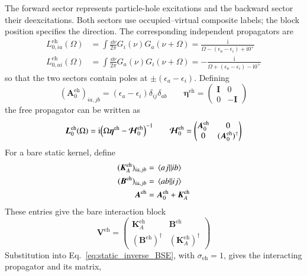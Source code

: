\documentclass[aip,jcp,reprint,noshowkeys,superscriptaddress]{revtex4-1}
\newcommand{\eh}{\text{eh}}
\newcommand{\ii}{\mathrm{i}}
\newcommand{\bA}{\boldsymbol{A}}
\newcommand{\bB}{\boldsymbol{B}}
\newcommand{\bI}{\boldsymbol{I}}
\newcommand{\bK}{\boldsymbol{K}}
\newcommand{\bL}{\boldsymbol{L}}
\newcommand{\bV}{\boldsymbol{V}}
\newcommand{\bEta}{\boldsymbol{\eta}}
\newcommand{\bcalH}{\boldsymbol{\mathcal{H}}}
\begin{document}
The forward sector represents particle-hole excitations and the backward
sector their deexcitations. Both sectors use occupied--virtual composite
labels; the block position specifies the direction. The corresponding
independent propagators are
\begin{align}
    L_{0,ia}^{\eh}(\Omega)
    &=
    \int\frac{\dd{\nu}}{2\pi}
    G_i(\nu)G_a(\nu+\Omega)
    =
    \frac{\ii}{\Omega-(\epsilon_a-\epsilon_i)+\ii 0^+}
    \\
    L_{0,ai}^{\eh}(\Omega)
    &=
    \int\frac{\dd{\nu}}{2\pi}
    G_a(\nu)G_i(\nu+\Omega)
    =
    -\frac{\ii}{\Omega+(\epsilon_a-\epsilon_i)-\ii 0^+}
    \label{eq:L0_eh_integrated}
\end{align}
so that the two sectors contain poles at $\pm(\epsilon_a-\epsilon_i)$.
Defining
\begin{equation*}
    (\bA_0^{\eh})_{ia,jb}
    =
    (\epsilon_a-\epsilon_i)\delta_{ij}\delta_{ab}
    \qquad
    \bEta^{\eh}
    =
    \begin{pmatrix}\bI&0\\0&-\bI\end{pmatrix}
\end{equation*}
the free propagator can be written as
\begin{equation}
    \bL_0^{\eh}(\Omega)
    =
    \ii
    \qty(
        \Omega\bEta^{\eh}-\bcalH_0^{\eh}
    )^{-1}
    \qquad
    \bcalH_0^{\eh}
    =
    \begin{pmatrix}
        \bA_0^{\eh}&0\\
        0&(\bA_0^{\eh})^{\dagger}
    \end{pmatrix}
    \label{eq:L0_eh_resolvent}
\end{equation}
For a bare static kernel, define
\begin{align}
    (\bK_A^{\eh})_{ia,jb}
    &=\mel{aj}{}{ib}
    \\
    (\bB^{\eh})_{ia,jb}
    &=\mel{ab}{}{ij}
    \\
    \bA^{\eh}
    &=\bA_0^{\eh}+\bK_A^{\eh}
\end{align}
These entries give the bare interaction block
\begin{equation}
 \bV^{\eh}=\begin{pmatrix}
 \bK_A^{\eh}&\bB^{\eh}\\
 (\bB^{\eh})^{\dagger}&(\bK_A^{\eh})^{\dagger}
 \end{pmatrix}
 \label{eq:bare_static_eh_block}
\end{equation}
Substitution into Eq.~\eqref{eq:static_inverse_BSE}, with
$\sigma_{\eh}=1$, gives the interacting propagator and its matrix,
\end{document}
